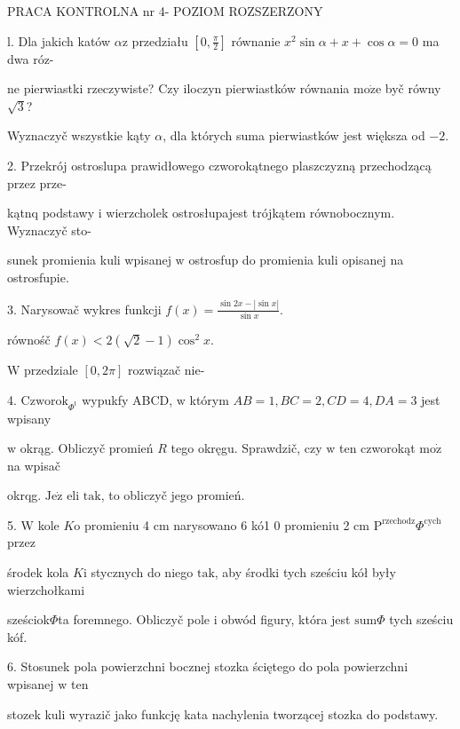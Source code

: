 \documentclass[a4paper,12pt]{article}
\begin{document}
PRACA KONTROLNA nr 4- POZIOM ROZSZERZONY

l. Dla jakich katów $\alpha \mathrm{z}$ przedziału $[0,\displaystyle \frac{\pi}{2}]$ równanie $x^{2}\sin\alpha+x+\cos\alpha=0$ ma dwa róz-

ne pierwiastki rzeczywiste? Czy iloczyn pierwiastków równania $\mathrm{m}\mathrm{o}\dot{\mathrm{z}}\mathrm{e}$ byč równy $\sqrt{3}$?

Wyznaczyč wszystkie kąty $\alpha$, dla których suma pierwiastków jest większa od $-2.$

2. Przekrój ostroslupa prawidłowego czworokątnego plaszczyzną przechodzącą przez prze-

kątnq podstawy $\mathrm{i}$ wierzcholek ostrosłupajest trójkątem równobocznym. Wyznaczyč sto-

sunek promienia kuli wpisanej $\mathrm{w}$ ostrosfup do promienia kuli opisanej na ostrosfupie.

3. Narysowač wykres funkcji $f(x)=\displaystyle \frac{\sin 2x-|\sin x|}{\sin x}.$

równośč $f(x)<2(\sqrt{2}-1)\cos^{2}x.$

$\mathrm{W}$ przedziale $[0,2\pi]$ rozwiązač nie-

4. $\mathrm{C}\mathrm{z}\mathrm{w}\mathrm{o}\mathrm{r}\mathrm{o}\mathrm{k}_{\Phi^{\mathrm{t}}}$ wypukfy ABCD, $\mathrm{w}$ którym $AB=1, BC=2, CD=4, DA=3$ jest wpisany

$\mathrm{w}$ okrąg. Obliczyč promień $R$ tego okręgu. Sprawdzič, czy $\mathrm{w}$ ten czworokąt $\mathrm{m}\mathrm{o}\dot{\mathrm{z}}$ na wpisač

okrqg. $\mathrm{J}\mathrm{e}\dot{\mathrm{z}}$ eli $\mathrm{t}\mathrm{a}\mathrm{k}$, to obliczyč jego promień.

5. $\mathrm{W}$ kole $K\mathrm{o}$ promieniu 4 cm narysowano 6 kó1 $0$ promieniu 2 cm $\mathrm{P}^{\mathrm{r}\mathrm{z}\mathrm{e}\mathrm{c}\mathrm{h}\mathrm{o}\mathrm{d}\mathrm{z}}\Phi^{\mathrm{c}\mathrm{y}\mathrm{c}\mathrm{h}}$ przez

środek kola $K\mathrm{i}$ stycznych do niego $\mathrm{t}\mathrm{a}\mathrm{k}$, aby środki tych sześciu kół były wierzchołkami

sześciok$\Phi$ta foremnego. Obliczyč pole $\mathrm{i}$ obwód figury, która jest $\mathrm{s}\mathrm{u}\mathrm{m}\Phi$ tych sześciu kóf.

6. Stosunek pola powierzchni bocznej stozka ściętego do pola powierzchni wpisanej $\mathrm{w}$ ten

stozek kuli wyrazič jako funkcję kata nachylenia tworzącej stozka do podstawy.
\end{document}
